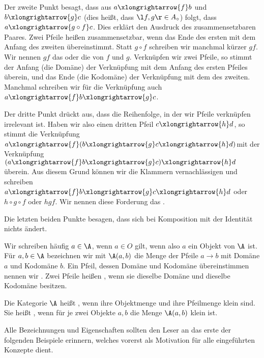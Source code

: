 Der zweite Punkt besagt, dass aus $a\xlongrightarrow{f}b$ und $b\xlongrightarrow{g}c$ (dies heißt, dass $\l f,g\r\in A_\circ$) folgt, dass $a\xlongrightarrow{g\circ f}c$. Dies erklärt den Ausdruck des zusammensetzbaren Paares. Zwei Pfeile heißen zusammensetzbar, wenn das Ende des ersten mit dem Anfang des zweiten übereinstimmt. Statt $g\circ f$ schreiben wir manchmal kürzer $gf$. Wir nennen $gf$ das  oder die  von $f$ und $g$. Verknüpfen wir zwei Pfeile, so stimmt der Anfang (die Domäne) der Verknüpfung mit dem Anfang des ersten Pfeiles überein, und das Ende (die Kodomäne) der Verknüpfung mit dem des zweiten. Manchmal schreiben wir für die Verknüpfung auch $a\xlongrightarrow{f}b\xlongrightarrow{g}c$.

Der dritte Punkt drückt aus, dass die Reihenfolge, in der wir Pfeile verknüpfen irrelevant ist. Haben wir also einen dritten Pfeil $c\xlongrightarrow{h}d$, so stimmt die Verknüpfung $a\xlongrightarrow{f}(b\xlongrightarrow{g}c\xlongrightarrow{h}d)$mit der Verknüpfung $(a\xlongrightarrow{f}b\xlongrightarrow{g}c)\xlongrightarrow{h}d$ überein. Aus diesem Grund können wir die Klammern vernachlässigen und schreiben $a\xlongrightarrow{f}b\xlongrightarrow{g}c\xlongrightarrow{h}d$ oder $h\circ g\circ f$ oder $hgf$. Wir nennen diese Forderung das .

Die letzten beiden Punkte besagen, dass sich bei Komposition mit der Identität nichts ändert.

Wir schreiben häufig $a\in\A$, wenn $a\in O$ gilt, wenn also $a$ ein Objekt von $\A$ ist. Für $a,b\in\A$ bezeichnen wir mit $\A(a,b)$ die Menge der Pfeile $a\longrightarrow b$ mit Domäne $a$ und Kodomäne $b$. Ein Pfeil, dessen Domäne und Kodomäne übereinstimmen nennen wir . Zwei Pfeile heißen , wenn sie dieselbe Domäne und dieselbe Kodomäne besitzen.

Die Kategorie $\A$ heißt , wenn ihre Objektmenge und ihre Pfeilmenge klein sind. Sie heißt , wenn für je zwei Objekte $a,b$ die Menge $\A(a,b)$ klein ist.

Alle Bezeichnungen und Eigenschaften sollten den Leser an das erste der folgenden Beispiele erinnern, welches vorerst als Motivation für alle eingeführten Konzepte dient.

